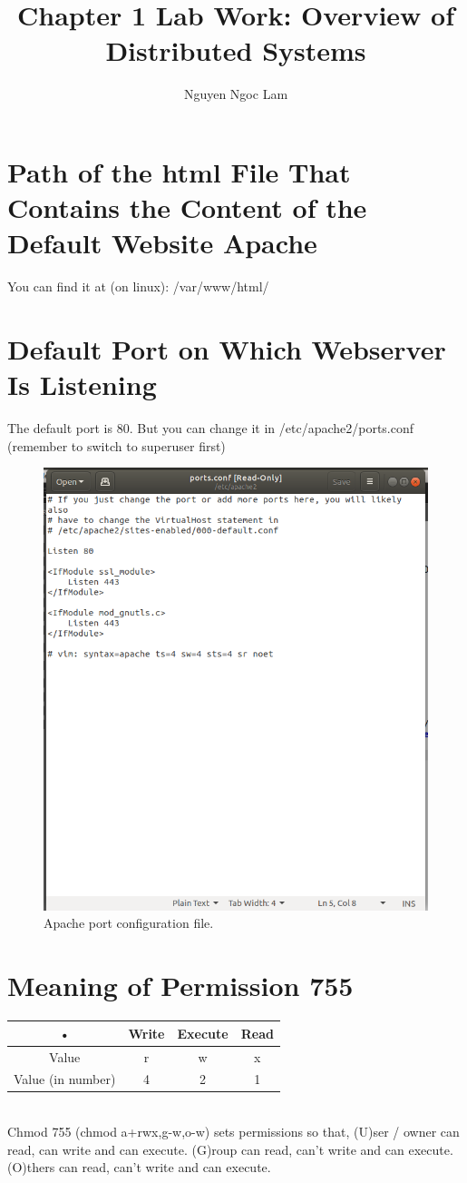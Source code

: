 \documentclass[11pt,a4paper]{article}
\title{Chapter 1 Lab Work: Overview of Distributed Systems}
\date{\displaydate{date}}
\author{Nguyen Ngoc Lam}
\begin{document}
  	\maketitle
  	\newpage
  	\tableofcontents
  	\newpage
	
	\section{Path of the html File That Contains the Content of the Default Website Apache}
	You can find it at (on linux): /var/www/html/
	\section{Default Port on Which Webserver Is Listening}
	The default port is 80. But you can change it in /etc/apache2/ports.conf (remember to switch to superuser first)
	\begin{figure}[h!]
  		\includegraphics[width=\linewidth]{apache-default-port.png}
  		\caption{Apache port configuration file.}
  		\label{fig:apacheconf}
	\end{figure}
	\newpage
	\section{Meaning of Permission 755}
	\begin{tabular}{|c|c|c|c|}
	\hline 
	• & Write & Execute & Read \\ 
	\hline 
	Value & r & w & x \\ 
	\hline 
	Value (in number) & 4 & 2 & 1 \\ 
	\hline 
	\end{tabular} 
	\\Chmod 755 (chmod a+rwx,g-w,o-w) sets permissions so that, (U)ser / owner can read, can write and can execute. (G)roup can read, can't write and can execute. (O)thers can read, can't write and can execute.
\end{document}
